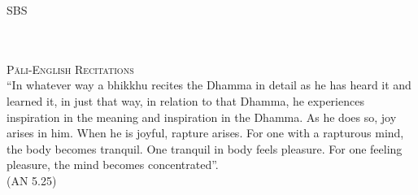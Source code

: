 
\cleartorecto
\thispagestyle{empty}
\vspace*{3em}

{\centering


  {\Huge\fontsize{64}{16}\sbsFont SBS}\\[1.0\baselineskip]%

  {\Huge\chapterTitleFont\textsc{{\thesubtitle\linebreak}}}\\[0.2\baselineskip]

  \\[1.4\baselineskip]

  {\Large\scshape Pāli-English Recitations}\\[2.5\baselineskip]

  {\quote ``In whatever way a bhikkhu recites the Dhamma in detail as he has heard it and learned it, in just that way, in relation to that Dhamma, he experiences inspiration in the meaning and inspiration in the Dhamma. As he does so, joy arises in him. When he is joyful, rapture arises. For one with a rapturous mind, the body becomes tranquil. One tranquil in body feels pleasure. For one feeling pleasure, the mind becomes concentrated''.\\ \smallskip (AN 5.25)}\\[1.4\baselineskip]
}

